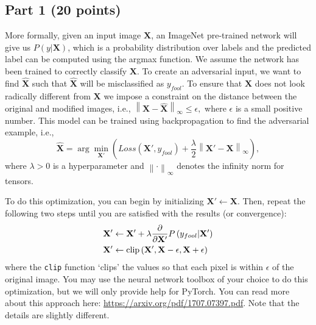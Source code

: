 \documentclass[11pt, oneside]{article}   	%
\begin{document}
\subsection*{Part 1 (20 points)}

More formally, given an input image $\mathbf{X}$, an ImageNet pre-trained network will give us $P\left( {y|{\mathbf{X}}} \right)$, which is a probability distribution over labels and the predicted label can be computed using the argmax function. We assume the network has been trained to correctly classify $\mathbf{X}$. To create an adversarial input, we want to find ${{\mathbf{\hat X}}}$ such that  ${{\mathbf{\hat X}}}$ will be misclassified as $y_{fool}$. To ensure that  ${{\mathbf{\hat X}}}$ does not look radically different from  $\mathbf{X}$ we impose a constraint on the distance between the original and modified images, i.e., $\left\| {{\mathbf{X}} - {\mathbf{\hat X}}} \right\|_\infty   \leqslant \epsilon ,$ where $\epsilon$ is a small positive number. This model can be trained using backpropagation to find the adversarial example, i.e.,
\[
{\mathbf{\hat X}} = \arg \min _{{\mathbf{X'}}} \left( {Loss\left( {{\mathbf{X'}},y_{fool} } \right) + \frac{\lambda }
{2}\left\| {{\mathbf{X'}} - {\mathbf{X}}} \right\|_\infty  } \right),
\]
where $\lambda > 0$ is a hyperparameter and $\left\| \cdot \right\|_\infty$ denotes the infinity norm for tensors.

To do this optimization, you can begin by initializing ${\mathbf{X'}} \leftarrow {\mathbf{X}}$. Then, repeat the following two steps until you are satisfied with the results (or convergence):
\[
\begin{gathered}
  {\mathbf{X'}} \leftarrow {\mathbf{X'}} + \lambda \frac{\partial }
{{\partial {\mathbf{X'}}}}P\left( {y_{fool} |{\mathbf{X'}}} \right) \hfill \\
  {\mathbf{X'}} \leftarrow {\text{clip}}\left( {{\mathbf{X'}},{\mathbf{X}} - \epsilon ,{\mathbf{X}} + \epsilon } \right) \hfill \\ 
\end{gathered} 
\]
where the \texttt{clip} function `clips' the values so that each pixel is within $ \epsilon$ of the original image. You may use the neural network toolbox of your choice to do this optimization, but we will only provide help for PyTorch. You can read more about this approach here: \url{https://arxiv.org/pdf/1707.07397.pdf}. Note that the details are slightly different.
\end{document}
